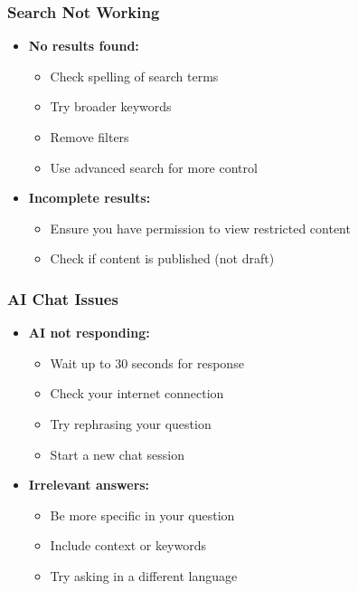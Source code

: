 \documentclass[12pt,a4paper]{article}
\begin{document}
\subsubsection{Search Not Working}
\begin{itemize}[leftmargin=*]
    \item \textbf{No results found:}
        \begin{itemize}
            \item Check spelling of search terms
            \item Try broader keywords
            \item Remove filters
            \item Use advanced search for more control
        \end{itemize}
    \item \textbf{Incomplete results:}
        \begin{itemize}
            \item Ensure you have permission to view restricted content
            \item Check if content is published (not draft)
        \end{itemize}
\end{itemize}

\subsubsection{AI Chat Issues}
\begin{itemize}[leftmargin=*]
    \item \textbf{AI not responding:}
        \begin{itemize}
            \item Wait up to 30 seconds for response
            \item Check your internet connection
            \item Try rephrasing your question
            \item Start a new chat session
        \end{itemize}
    \item \textbf{Irrelevant answers:}
        \begin{itemize}
            \item Be more specific in your question
            \item Include context or keywords
            \item Try asking in a different language
        \end{itemize}
\end{itemize}
\end{document}
